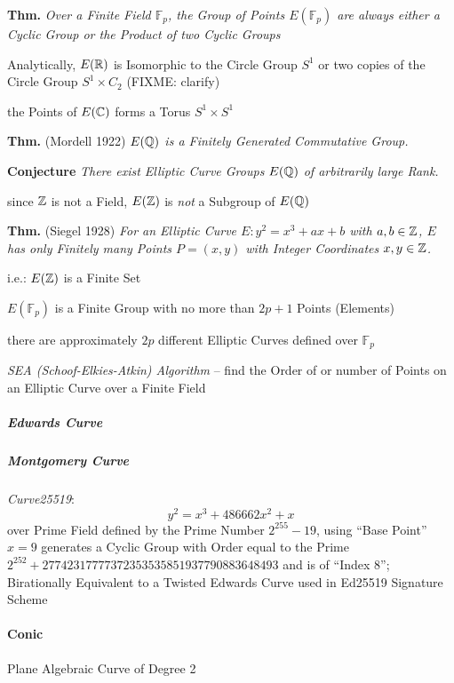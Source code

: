 \textbf{Thm.} \emph{Over a Finite Field $\mathbb{F}_p$, the Group of Points
  $E(\mathbb{F}_p)$ are always either a Cyclic Group or the Product of two
  Cyclic Groups}

Analytically, $E(\mathbb{R})$ is Isomorphic to the Circle Group $S^1$ or two copies
of the Circle Group $S^1 \times C_2$ (FIXME: clarify)

the Points of $E(\mathbb{C})$ forms a Torus $S^1 \times S^1$

\textbf{Thm.} (Mordell 1922) \emph{$E(\mathbb{Q})$ is a Finitely Generated
  Commutative Group.}

\textbf{Conjecture} \emph{There exist Elliptic Curve Groups $E(\mathbb{Q})$ of
  arbitrarily large Rank.}

since $\mathbb{Z}$ is not a Field, $E(\mathbb{Z})$ is \emph{not} a Subgroup of $E(\mathbb{Q})$

\textbf{Thm.} (Siegel 1928) \emph{For an Elliptic Curve $E : y^2 = x^3 + ax + b$
  with $a, b \in \mathbb{Z}$, $E$ has only Finitely many Points $P = (x,y)$ with
  Integer Coordinates $x,y \in \mathbb{Z}$.}

i.e.: $E(\mathbb{Z})$ is a Finite Set

$E(\mathbb{F}_p)$ is a Finite Group with no more than $2p + 1$ Points (Elements)

there are approximately $2p$ different Elliptic Curves defined over
$\mathbb{F}_p$

\emph{SEA (Schoof-Elkies-Atkin) Algorithm} -- find the Order of or number of
Points on an Elliptic Curve over a Finite Field



\subparagraph{Edwards Curve}\label{sec:edwards_curve}\hfill

\subparagraph{Montgomery Curve}\label{sec:montgomery_curve}\hfill

\emph{Curve25519}:
\[
  y^2 = x^3 + 486662 x^2 + x
\]
over Prime Field defined by the Prime Number $2^255 - 19$, using ``Base Point''
$x = 9$ generates a Cyclic Group with Order equal to the Prime
$2^252 + 27742317777372353535851937790883648493$ and is of ``Index $8$'';
Birationally Equivalent to a Twisted Edwards Curve used in Ed25519 Signature
Scheme



\paragraph{Conic}\label{sec:conic}\hfill

Plane Algebraic Curve of Degree 2

